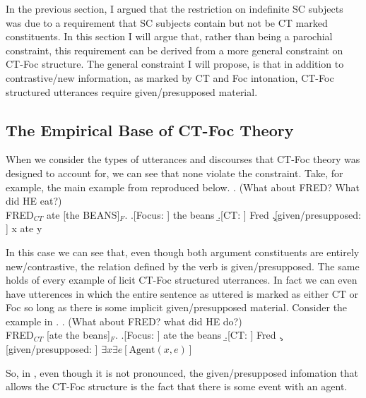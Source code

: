\documentclass[GPFinal]{subfiles}
\begin{document}
In the previous section, I argued that the restriction on indefinite SC subjects was due to a requirement that SC subjects contain but not be CT marked constituents.
In this section I will argue that, rather than being a parochial constraint, this requirement can be derived from a more general constraint on CT-Foc structure.
The general constraint I will propose, is that in addition to contrastive/new information, as marked by CT and Foc intonation, CT-Foc structured utterances require given/presupposed material.

\subsection{The Empirical Base of CT-Foc Theory}
When we consider the types of utterances and discourses that CT-Foc theory was designed to account for, we can see that none violate the constraint.
Take, for example, the main example from \textcite{jackendoff1972Ssemantics} reproduced below.
\ex. (What about FRED? What did HE eat?)\\
FRED$_{CT}$ ate [the BEANS]$_F$.
\a.[Focus: ] the beans
\b.[CT: ] Fred
\c.[given/presupposed: ] x ate y

In this case we can see that, even though both argument constituents are entirely new/contrastive, the relation defined by the verb is given/presupposed.
The same holds of every example of licit CT-Foc structured uterrances.
In fact we can even have utterences in which the entire sentence as uttered is marked as either CT or Foc so long as there is some implicit given/presupposed material.
Consider the example in \Next.
\ex. (What about FRED? what did HE do?)\\
FRED$_{CT}$ [ate the beans]$_F$.
\a.[Focus: ] ate the beans
\b.[CT: ] Fred
\c.[given/presupposed: ] $\exists x\exists e[\text{Agent}(x,e)]$

So, in \Last, even though it is not pronounced, the given/presupposed infomation that allows the CT-Foc structure is the fact that there is some event with an agent.
\end{document}
